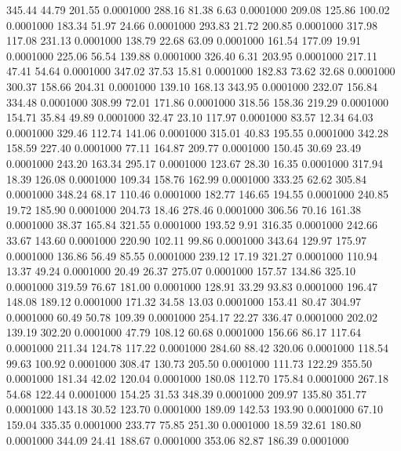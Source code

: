  345.44   44.79  201.55   0.0001000
 288.16   81.38    6.63   0.0001000
 209.08  125.86  100.02   0.0001000
 183.34   51.97   24.66   0.0001000
 293.83   21.72  200.85   0.0001000
 317.98  117.08  231.13   0.0001000
 138.79   22.68   63.09   0.0001000
 161.54  177.09   19.91   0.0001000
 225.06   56.54  139.88   0.0001000
 326.40    6.31  203.95   0.0001000
 217.11   47.41   54.64   0.0001000
 347.02   37.53   15.81   0.0001000
 182.83   73.62   32.68   0.0001000
 300.37  158.66  204.31   0.0001000
 139.10  168.13  343.95   0.0001000
 232.07  156.84  334.48   0.0001000
 308.99   72.01  171.86   0.0001000
 318.56  158.36  219.29   0.0001000
 154.71   35.84   49.89   0.0001000
  32.47   23.10  117.97   0.0001000
  83.57   12.34   64.03   0.0001000
 329.46  112.74  141.06   0.0001000
 315.01   40.83  195.55   0.0001000
 342.28  158.59  227.40   0.0001000
  77.11  164.87  209.77   0.0001000
 150.45   30.69   23.49   0.0001000
 243.20  163.34  295.17   0.0001000
 123.67   28.30   16.35   0.0001000
 317.94   18.39  126.08   0.0001000
 109.34  158.76  162.99   0.0001000
 333.25   62.62  305.84   0.0001000
 348.24   68.17  110.46   0.0001000
 182.77  146.65  194.55   0.0001000
 240.85   19.72  185.90   0.0001000
 204.73   18.46  278.46   0.0001000
 306.56   70.16  161.38   0.0001000
  38.37  165.84  321.55   0.0001000
 193.52    9.91  316.35   0.0001000
 242.66   33.67  143.60   0.0001000
 220.90  102.11   99.86   0.0001000
 343.64  129.97  175.97   0.0001000
 136.86   56.49   85.55   0.0001000
 239.12   17.19  321.27   0.0001000
 110.94   13.37   49.24   0.0001000
  20.49   26.37  275.07   0.0001000
 157.57  134.86  325.10   0.0001000
 319.59   76.67  181.00   0.0001000
 128.91   33.29   93.83   0.0001000
 196.47  148.08  189.12   0.0001000
 171.32   34.58   13.03   0.0001000
 153.41   80.47  304.97   0.0001000
  60.49   50.78  109.39   0.0001000
 254.17   22.27  336.47   0.0001000
 202.02  139.19  302.20   0.0001000
  47.79  108.12   60.68   0.0001000
 156.66   86.17  117.64   0.0001000
 211.34  124.78  117.22   0.0001000
 284.60   88.42  320.06   0.0001000
 118.54   99.63  100.92   0.0001000
 308.47  130.73  205.50   0.0001000
 111.73  122.29  355.50   0.0001000
 181.34   42.02  120.04   0.0001000
 180.08  112.70  175.84   0.0001000
 267.18   54.68  122.44   0.0001000
 154.25   31.53  348.39   0.0001000
 209.97  135.80  351.77   0.0001000
 143.18   30.52  123.70   0.0001000
 189.09  142.53  193.90   0.0001000
  67.10  159.04  335.35   0.0001000
 233.77   75.85  251.30   0.0001000
  18.59   32.61  180.80   0.0001000
 344.09   24.41  188.67   0.0001000
 353.06   82.87  186.39   0.0001000
